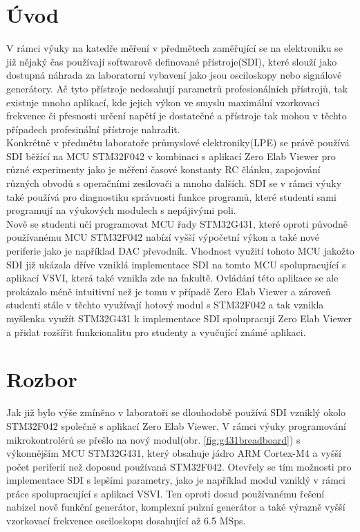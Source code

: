 
\chapter{Úvod}
V rámci výuky na katedře měření v předmětech zaměřující se na elektroniku se již nějaký čas používají softwarově definované přístroje(SDI), které slouží jako dostupná náhrada za laboratorní vybavení jako jsou osciloskopy nebo signálové generátory. Ač tyto přístroje nedosahují parametrů profesionálních přístrojů, tak existuje mnoho aplikací, kde jejich výkon ve smyslu maximální vzorkovací frekvence či přesnosti určení napětí je dostatečné a přístroje tak mohou v těchto případech profesinální přístroje nahradit.\\

Konkrétně v předmětu laboratoře průmyslové elektroniky(LPE) se právě používá SDI běžící na MCU STM32F042 v kombinaci s aplikací Zero Elab Viewer pro různé experimenty jako je měření časové konstanty RC článku, zapojování různých obvodů s operačními zesilovači a mnoho dalších. SDI se v rámci výuky také používá pro diagnostiku správnosti funkce programů, které studenti sami programují na výukových modulech s nepájivými poli.\\

Nově se studenti učí programovat MCU řady STM32G431, které oproti původně používanému MCU STM32F042 nabízí vyšší výpočetní výkon a také nové periferie jako je například DAC převodník. Vhodnost využití tohoto MCU jakožto SDI již ukázala dříve vzniklá implementace SDI na tomto MCU spolupracující s aplikací VSVI, která také vznikla zde na fakultě. Ovládání této aplikace se ale prokázalo méně intuitivní než je tomu v případě Zero Elab Viewer a zároveň studenti stále v těchto využívají hotový modul s STM32F042 a tak vznikla myšlenka využít STM32G431 k implementace SDI spolupracují Zero Elab Viewer a přidat rozšířit funkcionalitu pro studenty a vyučující známé aplikaci.


\chapter{Rozbor}
Jak již bylo výše zmíněno v laboratoři se dlouhodobě používá SDI vzniklý okolo STM32F042 společně s aplikací Zero Elab Viewer. V rámci výuky programování mikrokontrolérů se přešlo na nový modul(obr. \ref{fig:g431breadboard}) s výkonnějším MCU STM32G431, který obsahuje jádro ARM Cortex-M4 a vyšší počet periferií než doposud používaná STM32F042. Otevřely se tím možnosti pro implementace SDI s lepšími parametry, jako je například modul vzniklý v rámci práce \cite{DujavaDIP} spolupracující s aplikací VSVI. Ten oproti dosud používanému řešení nabízel nově funkční generátor, komplexní pulzní generátor a také výrazně vyšší vzorkovací frekvence osciloskopu dosahující až 6.5 MSps.

